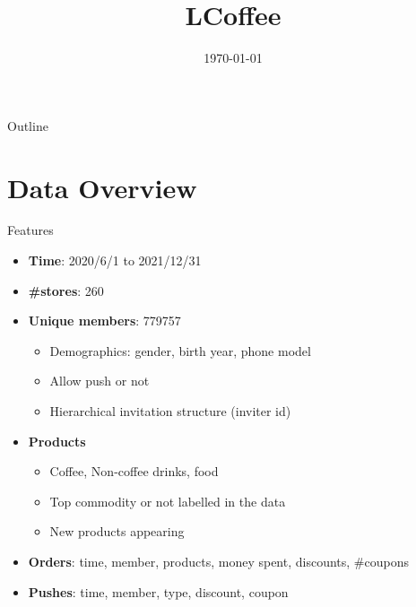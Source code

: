 \documentclass[aspectratio=169]{beamer}  %
\title{LCoffee}
\date{\today}
\begin{document}
\begin{frame}
    \titlepage
\end{frame}

\begin{frame}{Outline}
    \tableofcontents
\end{frame}




\section{Data Overview}
\begin{frame}{Features}
\begin{itemize}
    \item \textbf{Time}: 2020/6/1 to 2021/12/31
    \item \textbf{\#stores}: 260
    \item \textbf{Unique members}: 779757
    \begin{itemize}
        \item Demographics: gender, birth year, phone model
        \item Allow push or not
        \item Hierarchical invitation structure (inviter id)
    \end{itemize}
    \item \textbf{Products}
    \begin{itemize}
        \item Coffee, Non-coffee drinks, food
        \item Top commodity or not labelled in the data
        \item New products appearing
    \end{itemize}
    \item \textbf{Orders}: time, member, products, money spent, discounts, \#coupons
    \item \textbf{Pushes}: time, member, type, discount, coupon
\end{itemize}    
\end{frame}
\end{document}
